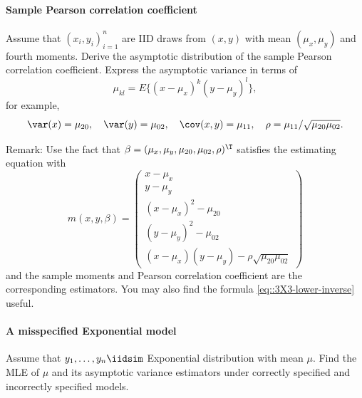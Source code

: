 \paragraph{Sample Pearson correlation coefficient}\label{hw-math4::pearson-cor-asym}

Assume that $(x_i, y_i)_{i=1}^n$ are IID draws from $(x,y)$ with mean $(\mu_x, \mu_y)$ and fourth moments. Derive the asymptotic distribution of the sample Pearson correlation coefficient. Express the asymptotic variance in terms of
$$
\mu_{kl} = E\{  (x-\mu_x)^k (y-\mu_y)^l \},
$$
for example, 
$$
\var(x) = \mu_{20}, \quad  \var(y) = \mu_{02},   \quad \cov(x,y) = \mu_{11},  \quad \rho = \mu_{11} / \sqrt{ \mu_{20}   \mu_{02} } .
$$

Remark: Use the fact that $\beta = (\mu_x, \mu_y, \mu_{20}, \mu_{02}, \rho)^{\T}$ satisfies the estimating equation with
$$
m(x,y,\beta) = \begin{pmatrix}
x - \mu_x \\
y - \mu_y \\
(x - \mu_x)^2 - \mu_{20} \\
(y - \mu_y)^2 - \mu_{02} \\
(x - \mu_x)(y - \mu_y) - \rho \sqrt{ \mu_{20}  \mu_{02} }
\end{pmatrix}
$$
and the sample moments and Pearson correlation coefficient are the corresponding estimators. 
You may also find the formula \eqref{eq::3X3-lower-inverse} useful. 


 


\paragraph{A misspecified Exponential model}\label{hw00math3::sandwich-exponential}
Assume that $y_1,\ldots, y_n \iidsim $ Exponential distribution with  mean $\mu  $. Find the MLE of $\mu$ and its asymptotic variance estimators under correctly specified and incorrectly specified models.

 


